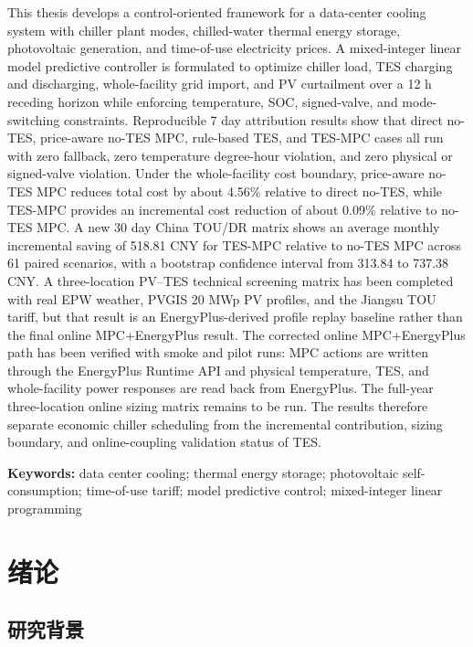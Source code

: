 \documentclass[UTF8,a4paper,12pt]{ctexrep}
\begin{document}
This thesis develops a control-oriented framework for a data-center cooling system with chiller plant modes, chilled-water thermal energy storage, photovoltaic generation, and time-of-use electricity prices. A mixed-integer linear model predictive controller is formulated to optimize chiller load, TES charging and discharging, whole-facility grid import, and PV curtailment over a 12 h receding horizon while enforcing temperature, SOC, signed-valve, and mode-switching constraints. Reproducible 7 day attribution results show that direct no-TES, price-aware no-TES MPC, rule-based TES, and TES-MPC cases all run with zero fallback, zero temperature degree-hour violation, and zero physical or signed-valve violation. Under the whole-facility cost boundary, price-aware no-TES MPC reduces total cost by about 4.56\% relative to direct no-TES, while TES-MPC provides an incremental cost reduction of about 0.09\% relative to no-TES MPC. A new 30 day China TOU/DR matrix shows an average monthly incremental saving of 518.81 CNY for TES-MPC relative to no-TES MPC across 61 paired scenarios, with a bootstrap confidence interval from 313.84 to 737.38 CNY. A three-location PV--TES technical screening matrix has been completed with real EPW weather, PVGIS 20 MWp PV profiles, and the Jiangsu TOU tariff, but that result is an EnergyPlus-derived profile replay baseline rather than the final online MPC+EnergyPlus result. The corrected online MPC+EnergyPlus path has been verified with smoke and pilot runs: MPC actions are written through the EnergyPlus Runtime API and physical temperature, TES, and whole-facility power responses are read back from EnergyPlus. The full-year three-location online sizing matrix remains to be run. The results therefore separate economic chiller scheduling from the incremental contribution, sizing boundary, and online-coupling validation status of TES.

\textbf{Keywords:} data center cooling; thermal energy storage; photovoltaic self-consumption; time-of-use tariff; model predictive control; mixed-integer linear programming

\tableofcontents

\chapter{绪论}

\section{研究背景}
\end{document}
